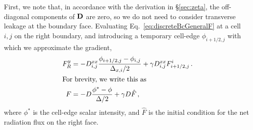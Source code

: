 First, we note that, in accordance with the derivation in \S\ref{sec:zeta}, the
off-diagonal components of $\mathbf{D}$ are zero, so we do not need to consider
transverse leakage at the boundary face. Evaluating
Eq.~\eqref{eq:discreteBcGeneralF} at a cell $i,j$ on the right boundary, and
introducing a temporary cell-edge $\phi_{i+1/2,j}$ with which we approximate the
gradient,
\begin{align} \nonumber
  F_R^y 
  &= - D_{i,j}^{xx} \frac{\phi_{i+1/2,j} - \phi_{i,j}}{\Delta_{x,i} / 2}
  + \gamma D_{i,j}^{xx} F_{i+1/2,j}^{i} \,.
\\ 
\intertext{For brevity, we write this as}
\label{eq:discreteBcFBrief}
  F
  &= - D \frac{\phi^* - \phi}{\Delta / 2}
  + \gamma D \hat F \,,
\end{align}
where $\phi^*$ is the cell-edge scalar intensity, and $\hat F$ is the initial
condition for the net radiation flux on the right face.

